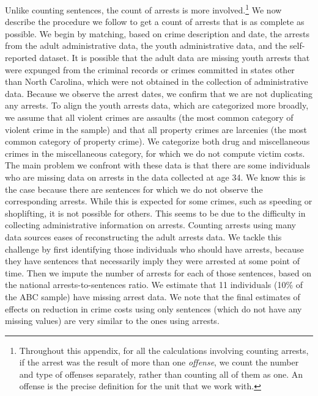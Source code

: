 \noindent Unlike counting sentences, the count of arrests is more involved.\footnote{Throughout this appendix, for all the calculations involving counting arrests, if the arrest was the result of more than one \textit{offense}, we count the number and type of offenses separately, rather than counting all of them as one. An offense is the precise definition for the unit that we work with.} We now describe the procedure we follow to get a count of arrests that is as complete as possible. We begin by matching, based on crime description and date, the arrests from the adult administrative data, the youth administrative data, and the self-reported dataset. It is possible that the adult data are missing youth arrests that were expunged from the criminal records or crimes committed in states other than North Carolina, which were not obtained in the collection of administrative data. Because we observe the arrest dates, we confirm that we are not duplicating any arrests. To align the youth arrests data, which are categorized more broadly, we assume that all violent crimes are assaults (the most common category of violent crime in the sample) and that all property crimes are larcenies (the most common category of property crime). We categorize both drug and miscellaneous crimes in the miscellaneous category, for which we do not compute victim costs. \\

\noindent The main problem we confront with these data is that there are some individuals who are missing data on arrests in the data collected at age 34. We know this is the case because there are sentences for which we do not observe the corresponding arrests. While this is expected for some crimes, such as speeding or shoplifting, it is not possible for others. This seems to be due to the difficulty in collecting administrative information on arrests. Counting arrests using many data sources eases of reconstructing the adult arrests data. We tackle this challenge by first identifying those individuals who should have arrests, because they have sentences that necessarily imply they were arrested at some point of time. Then we impute the number of arrests for each of those sentences, based on the national arrests-to-sentences ratio. We estimate that 11 individuals (10\% of the ABC sample) have missing arrest data. We note that the final estimates of effects on reduction in crime costs using only sentences (which do not have any missing values) are very similar to the ones using arrests. \\

